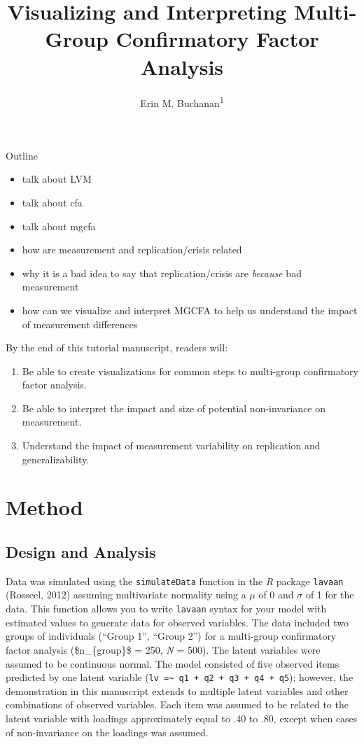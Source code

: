 \documentclass[
  man]{apa6}
\title{Visualizing and Interpreting Multi-Group Confirmatory Factor Analysis}
\author{Erin M. Buchanan\textsuperscript{1}}
\date{}
\affiliation{\vspace{0.5cm}\textsuperscript{1} Harrisburg University of Science and Technology}
\providecommand{\tightlist}{%
  \setlength{\itemsep}{0pt}\setlength{\parskip}{0pt}}
\begin{document}
\maketitle

Outline

\begin{itemize}
\item
  talk about LVM
\item
  talk about cfa
\item
  talk about mgcfa
\item
  how are measurement and replication/crisis related
\item
  why it is a bad idea to say that replication/crisis are \emph{because} bad measurement
\item
  how can we visualize and interpret MGCFA to help us understand the impact of measurement differences
\end{itemize}

By the end of this tutorial manuscript, readers will:

\begin{enumerate}
\def\labelenumi{\arabic{enumi}.}
\tightlist
\item
  Be able to create visualizations for common steps to multi-group confirmatory factor analysis.
\item
  Be able to interpret the impact and size of potential non-invariance on measurement.
\item
  Understand the impact of measurement variability on replication and generalizability.
\end{enumerate}

\hypertarget{method}{%
\section{Method}\label{method}}

\hypertarget{design-and-analysis}{%
\subsection{Design and Analysis}\label{design-and-analysis}}

Data was simulated using the \texttt{simulateData} function in the \emph{R} package \texttt{lavaan} (Rosseel, 2012) assuming multivariate normality using a \(\mu\) of 0 and \(\sigma\) of 1 for the data. This function allows you to write \texttt{lavaan} syntax for your model with estimated values to generate data for observed variables. The data included two groups of individuals (``Group 1'', ``Group 2'') for a multi-group confirmatory factor analysis (\$n\_\{group\}\$ = 250, \emph{N} = 500). The latent variables were assumed to be continuous normal. The model consisted of five observed items predicted by one latent variable (\texttt{lv\ =\textasciitilde{}\ q1\ +\ q2\ +\ q3\ +\ q4\ +\ q5}); however, the demonstration in this manuscript extends to multiple latent variables and other combinations of observed variables. Each item was assumed to be related to the latent variable with loadings approximately equal to .40 to .80, except when cases of non-invariance on the loadings was assumed.
\end{document}
